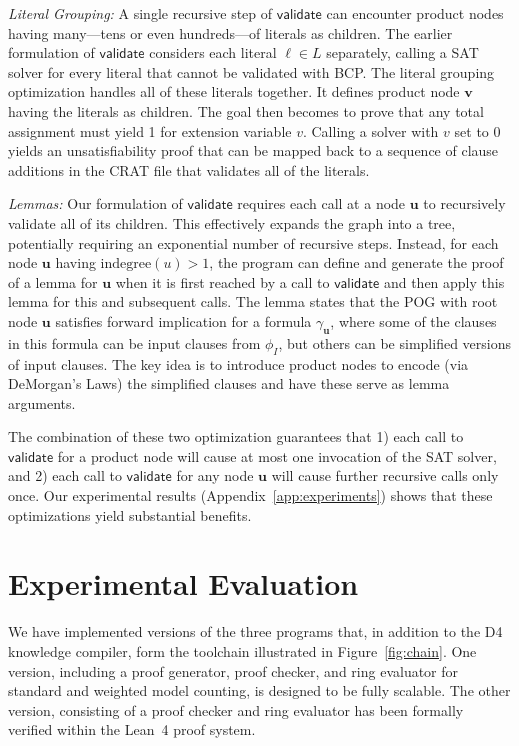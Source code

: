 \documentclass[letterpaper,USenglish,cleveref, autoref, thm-restate]{lipics-v2021}
\newcommand{\lit}{\ell}
\newcommand{\indegree}{\textrm{indegree}}
\newcommand{\validate}{\textsf{validate}}
\newcommand{\inputformula}{\phi_I}
\newcommand{\makenode}[1]{\mathbf{#1}}
\newcommand{\nodeu}{\makenode{u}}
\newcommand{\nodev}{\makenode{v}}
\newcommand{\progname}[1]{\textsc{#1}}
\newcommand{\dfour}{\progname{D4}}
\newcommand{\lean}{Lean~4}
\begin{document}
{\em Literal Grouping:} A single recursive step of $\validate$ can encounter product nodes
having many---tens or even hundreds---of literals as children.  The
earlier formulation of $\validate$ considers each literal $\lit \in L$
separately, calling a SAT solver for every literal that cannot be
validated with BCP\@.  The literal grouping optimization handles
all of these literals together.  It defines product node $\nodev$
having the literals as children.  The goal then becomes to prove that
any total assignment must yield 1 for extension variable $v$.  Calling
a solver with $v$ set to 0 yields an unsatisfiability proof that can
be mapped back to a sequence of clause additions in the CRAT file that
validates all of the literals.

{\em Lemmas:} Our formulation of $\validate$ requires each call at a
node $\nodeu$ to recursively validate all of its children.  This
effectively expands the graph into a tree, potentially requiring an
exponential number of recursive steps.  Instead, for each node
$\nodeu$ having $\indegree(u) > 1$, the program can define and
generate the proof of a lemma for $\nodeu$ when it is first reached by
a call to $\validate$ and then apply this lemma for this and
subsequent calls.  The lemma states that the POG with root node
$\nodeu$ satisfies forward implication for a formula
$\gamma_{\nodeu}$, where some of the clauses in this formula can be
input clauses from $\inputformula$, but others can be simplified
versions of input clauses.
The key idea is to introduce product nodes to encode (via DeMorgan's
Laws) the simplified clauses and have these serve as lemma arguments.

The combination of these two optimization guarantees that 1) each call
to $\validate$ for a product node will cause at most one invocation of
the SAT solver, and 2) each call to $\validate$ for any node $\nodeu$
will cause further recursive calls only once.  Our experimental
results (Appendix~\ref{app:experiments}) shows that these
optimizations yield substantial benefits.






\section{Experimental Evaluation}
\label{sect:experimental}
We have implemented versions of the three programs that, in addition to the \dfour{} knowledge compiler,  form the
toolchain illustrated in Figure~\ref{fig:chain}.  One version,
including a proof generator, proof checker, and ring evaluator for
standard and weighted model counting, is designed to be fully
scalable.  The other version, consisting of a proof checker and
ring evaluator has been formally verified within the \lean{} proof
system.
\end{document}
